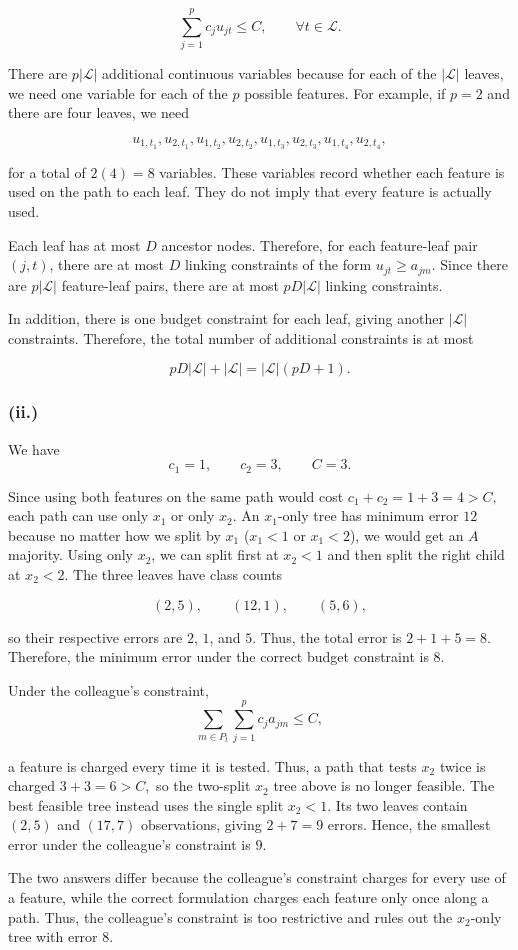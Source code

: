 \documentclass{article}
\begin{document}
$$
\sum_{j=1}^p c_j u_{jt}\leq C,
\qquad
\forall t\in\mathcal{L}.
$$


\vspace{5mm}
There are $p|\mathcal{L}|$ additional continuous variables because for each of the $|\mathcal{L}|$ leaves, we need one variable for each of the $p$ possible features. For example, if $p=2$ and there are four leaves, we need

$$
u_{1,t_1},u_{2,t_1},
u_{1,t_2},u_{2,t_2},
u_{1,t_3},u_{2,t_3},
u_{1,t_4},u_{2,t_4},
$$

for a total of $
2(4)=8
$ variables. These variables record whether each feature is used on the path to each leaf. They do not imply that every feature is actually used.

Each leaf has at most $D$ ancestor nodes. Therefore, for each feature-leaf pair $(j,t)$, there are at most $D$ linking constraints of the form $
u_{jt}\geq a_{jm}.
$ Since there are $p|\mathcal{L}|$ feature-leaf pairs, there are at most $
pD|\mathcal{L}|
$ linking constraints.

In addition, there is one budget constraint for each leaf, giving another $
|\mathcal{L}|
$ constraints. Therefore, the total number of additional constraints is at most

$$
pD|\mathcal{L}|+|\mathcal{L}|
=
\boxed{|\mathcal{L}|(pD+1).}
$$

\newpage

\subsubsection*{(ii.)}


We have $$ 
c_1=1,\qquad c_2=3,\qquad C=3.
$$

Since using both features on the same path would cost $
c_1+c_2=1+3=4>C,
$ each path can use only $x_1$ or only $x_2$. An $x_1$-only tree has minimum error $12$ because no matter how we split by $x_1$ ($x_1 < 1$ or $x_1 < 2$), we would get an $A$ majority. Using only $x_2$, we can split first at $x_2<1$ and then split the right child at $x_2<2$. The three leaves have class counts

$$
(2,5),\qquad (12,1),\qquad (5,6),
$$

so their respective errors are $2$, $1$, and $5$. Thus, the total error is $
2+1+5=8.
$ Therefore, the minimum error under the correct budget constraint is $
\boxed{8}.
$

Under the colleague's constraint,
$$
\sum_{m\in P_t}\sum_{j=1}^p c_j a_{jm}\leq C,
$$

a feature is charged every time it is tested. Thus, a path that tests $x_2$ twice is charged $
3+3=6>C,
$ so the two-split $x_2$ tree above is no longer feasible. The best feasible tree instead uses the single split $x_2<1$. Its two leaves contain $(2,5)$ and $(17,7)$ observations, giving $
2+7=9
$ errors. Hence, the smallest error under the colleague's constraint is $
\boxed{9}.
$

The two answers differ because the colleague's constraint charges for every use of a feature, while the correct formulation charges each feature only once along a path. Thus, the colleague's constraint is too restrictive and rules out the $x_2$-only tree with error $8$.
\end{document}
